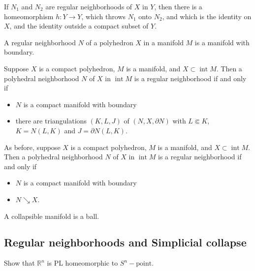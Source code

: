 \documentclass[12pt]{pset}
\newcommand{\collapses}{\searrow}
\DeclareMathOperator{\interior}{int}
\newcommand{\fullsubcomplex}{\Subset}
\begin{document}
\begin{theorem*}
  If $N_1$ and $N_2$ are regular neighborhoods of $X$ in $Y$, then
  there is a homeomorphism $h : Y \to Y$, which throws $N_1$ onto
  $N_2$, and which is the identity on $X$, and the identity outside a compact subset of $Y$.
\end{theorem*}

\begin{theorem*}
  A regular neighborhood $N$ of a polyhedron $X$ in a manifold $M$ is a manifold with boundary.
\end{theorem*}


 \begin{theorem*}
   Suppose $X$ is a compact polyhedron,  $M$ is a manifold, and $X
   \subset \interior M$.   Then a polyhedral neighborhood $N$ of $X$ in $\interior
   M$ is a regular neighborhood if and only if
    \begin{itemize}
    \item $N$ is a compact manifold with boundary
    \item there are triangulations $(K,L,J)$ of $(N,X,\partial N)$
      with $L \fullsubcomplex K$, $K = N(L,K)$ and $J = \partial N(L,K)$.
    \end{itemize}
  \end{theorem*}

 \begin{theorem*}
    As before, suppose $X$ is a compact polyhedron, $M$ is a manifold,
    and $X \subset \interior M$.
    Then a polyhedral neighborhood $N$ of $X$ in $\interior
    M$ is a regular neighborhood if and only if
   \begin{itemize}
   \item $N$ is a compact manifold with boundary
   \item $N \collapses X$.
   \end{itemize}
 \end{theorem*}

\begin{corollary*}
 A collapsible manifold is a ball.
\end{corollary*}

\subsection*{Regular neighborhoods and Simplicial collapse}

\begin{problem}  Show that $\mathbb{R}^n$ is PL homeomorphic to $S^n - \mbox{point}$.
\end{problem}
\end{document}
